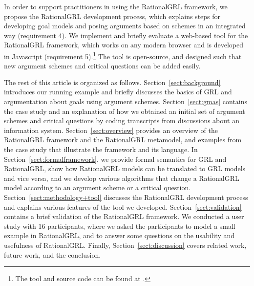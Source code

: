 In order to support practitioners in using the RationalGRL framework, we propose the RationalGRL development process, which explains steps for developing goal models and posing arguments based on schemes in an integrated way (requirement 4). We implement and briefly evaluate a web-based tool for the RationalGRL framework, which works on any modern browser and is developed in Javascript (requirement 5).\footnote{The tool and source code can be found at \rationalgrlurl.} The tool is open-source, and designed such that new argument schemes and critical questions can be added easily.

The rest of this article is organized as follows. Section~\ref{sect:background} introduces our running example and briefly discusses the basics of GRL and argumentation about goals using argument schemes. Section~\ref{sect:gmas} contains the case study and an explanation of how we obtained an initial set of argument schemes and critical questions by coding transcripts from discussions about an information system. Section~\ref{sect:overview} provides an overview of the RationalGRL framework and the RationalGRL metamodel, and examples from the case study that illustrate the framework and its language. In Section~\ref{sect:formalframework}, we provide formal semantics for GRL and RationalGRL, show how RationalGRL models can be translated to GRL models and vice versa, and we develop various algorithms that change a RationalGRL model according to an argument scheme or a critical question. Section~\ref{sect:methodology+tool} discusses the RationalGRL development process and explains various features of the tool we developed. Section~\ref{sect:validation} contains a brief validation of the RationalGRL framework. We conducted a user study with 16 participants, where we asked the participants to model a small example in RationalGRL, and to answer some questions on the usability and usefulness of RationalGRL. Finally, Section~\ref{sect:discussion} covers related work, future work, and the conclusion.
